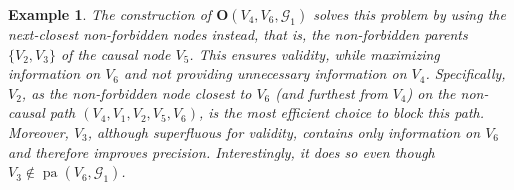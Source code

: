 \documentclass[11pt,a4paper]{article}
\newtheorem{Example}[Satz]{Example}
\theoremstyle{definition}
\theoremstyle{remark}
\DeclareMathOperator{\Forbb}{forb}
\DeclareMathOperator{\pa}{pa}
\DeclareMathOperator{\posspa}{posspa}
\newcommand{\mpdag}{maximal PDAG}
\newcommand{\g}[1][G]{\mathcal{#1}}
\newcommand{\f}[2][X,Y]{\Forbb(#1,#2)}
\newcommand{\fb}[2][X,Y]{\Forbb(\mathbf{#1},#2)}
\newcommand{\opt}[2][X,Y]{\mathbf{O}(#1,#2)}
\newcommand{\optb}[2][X,Y]{\mathbf{O}(\mathbf{#1},#2)}
\begin{document}
\begin{Example}
	The construction of $\boldsymbol{O}(V_4,V_6,\g_1)$ solves this problem by using the next-closest non-forbidden nodes instead, that is, the non-forbidden parents $\{V_2,V_3\}$ of the causal node $V_5$. This ensures validity, while maximizing information on $V_6$ and not providing unnecessary information on $V_4$. 
	Specifically, $V_2$, as the non-forbidden node closest to $V_6$ (and furthest from $V_4$) on the non-causal path $(V_4,V_1,V_2,V_5,V_6)$, is the most efficient choice to block this path. Moreover, $V_3$, although superfluous for validity, contains only information on $V_6$ and therefore improves precision. Interestingly, it does so even though $V_3 \notin \pa(V_6,\g_1)$.
	
	
	
	
	
\end{Example}


\end{document}

